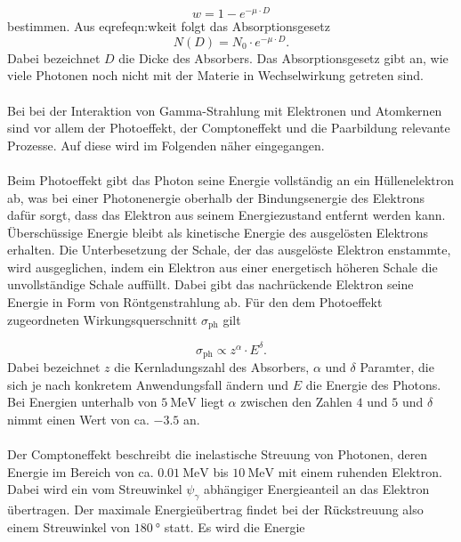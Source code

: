 \begin{equation}
  \label{eqn:wkeit}
  w = 1 - e^{-\mu \cdot D}
\end{equation}
bestimmen. Aus eqref{eqn:wkeit} folgt das Absorptionsgesetz
\begin{equation}
  \label{eqn:absorption}
  N(D) = N_{0} \cdot e^{-\mu \cdot D}.
\end{equation}
Dabei bezeichnet $D$ die Dicke des Absorbers. Das Absorptionsgesetz gibt an, wie viele Photonen
noch nicht mit der Materie in Wechselwirkung getreten sind.\\ \\
Bei bei der Interaktion von Gamma-Strahlung mit Elektronen und Atomkernen sind vor allem
der Photoeffekt, der Comptoneffekt und die Paarbildung relevante
Prozesse. Auf diese wird im Folgenden näher eingegangen.\\ \\
Beim Photoeffekt gibt das Photon seine Energie vollständig an ein Hüllenelektron ab, was bei
einer Photonenergie oberhalb der Bindungsenergie des Elektrons dafür sorgt, dass das Elektron
aus seinem Energiezustand entfernt werden kann. Überschüssige Energie bleibt als kinetische
Energie des ausgelösten Elektrons erhalten. Die Unterbesetzung der Schale, der das ausgelöste
Elektron enstammte, wird ausgeglichen, indem ein Elektron aus einer energetisch höheren Schale
die unvollständige Schale auffüllt. Dabei gibt das nachrückende Elektron seine Energie
in Form von Röntgenstrahlung ab. Für den dem Photoeffekt zugeordneten Wirkungsquerschnitt $\sigma_\text{ph}$ gilt

\begin{equation}
  \label{eqn:phquerschnitt}
  \sigma_\text{ph} \propto z^{\alpha} \cdot E^{\delta}.
\end{equation}
Dabei bezeichnet $z$ die Kernladungszahl des Absorbers, $\alpha$ und $\delta$ Paramter, die sich je nach konkretem Anwendungsfall
ändern und $E$ die Energie des Photons. Bei Energien unterhalb von $\SI{5}{\mega\electronvolt}$ liegt $\alpha$ zwischen den Zahlen
$4$ und $5$ und $\delta$ nimmt einen Wert von ca. $-3.5$ an.\\ \\
Der Comptoneffekt beschreibt die inelastische Streuung von Photonen, deren Energie im Bereich von ca.
$\SI{0.01}{\mega\electronvolt}$ bis $\SI{10}{\mega\electronvolt}$ mit einem
ruhenden Elektron.\\
Dabei wird ein vom Streuwinkel $\psi_{\gamma}$ abhängiger Energieanteil an das Elektron übertragen.
Der maximale Energieübertrag findet bei der Rückstreuung also einem Streuwinkel
von $\SI{180}{\degree}$ statt. Es wird die Energie

